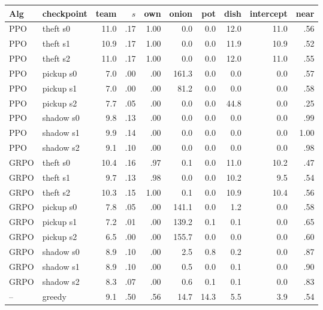 \begin{tabular}{@{}llrrrrrrrr@{}}
\toprule
Alg & checkpoint & team & $s$ & own & onion & pot & dish & intercept & near \\
\midrule
PPO & theft s0 & 11.0 & .17 & 1.00 & 0.0 & 0.0 & 12.0 & 11.0 & .56 \\
PPO & theft s1 & 10.9 & .17 & 1.00 & 0.0 & 0.0 & 11.9 & 10.9 & .52 \\
PPO & theft s2 & 11.0 & .17 & 1.00 & 0.0 & 0.0 & 12.0 & 11.0 & .55 \\
PPO & pickup s0 & 7.0 & .00 & .00 & 161.3 & 0.0 & 0.0 & 0.0 & .57 \\
PPO & pickup s1 & 7.0 & .00 & .00 & 81.2 & 0.0 & 0.0 & 0.0 & .58 \\
PPO & pickup s2 & 7.7 & .05 & .00 & 0.0 & 0.0 & 44.8 & 0.0 & .25 \\
PPO & shadow s0 & 9.8 & .13 & .00 & 0.0 & 0.0 & 0.0 & 0.0 & .99 \\
PPO & shadow s1 & 9.9 & .14 & .00 & 0.0 & 0.0 & 0.0 & 0.0 & 1.00 \\
PPO & shadow s2 & 9.1 & .10 & .00 & 0.0 & 0.0 & 0.0 & 0.0 & .98 \\
\midrule
GRPO & theft s0 & 10.4 & .16 & .97 & 0.1 & 0.0 & 11.0 & 10.2 & .47 \\
GRPO & theft s1 & 9.7 & .13 & .98 & 0.0 & 0.0 & 10.2 & 9.5 & .54 \\
GRPO & theft s2 & 10.3 & .15 & 1.00 & 0.1 & 0.0 & 10.9 & 10.4 & .56 \\
GRPO & pickup s0 & 7.8 & .05 & .00 & 141.1 & 0.0 & 1.2 & 0.0 & .58 \\
GRPO & pickup s1 & 7.2 & .01 & .00 & 139.2 & 0.1 & 0.1 & 0.0 & .65 \\
GRPO & pickup s2 & 6.5 & .00 & .00 & 155.7 & 0.0 & 0.0 & 0.0 & .60 \\
GRPO & shadow s0 & 8.9 & .10 & .00 & 2.5 & 0.8 & 0.2 & 0.0 & .87 \\
GRPO & shadow s1 & 8.9 & .10 & .00 & 0.5 & 0.0 & 0.1 & 0.0 & .90 \\
GRPO & shadow s2 & 8.3 & .07 & .00 & 0.6 & 0.1 & 0.1 & 0.0 & .83 \\
\midrule
-- & greedy & 9.1 & .50 & .56 & 14.7 & 14.3 & 5.5 & 3.9 & .54 \\
\bottomrule
\end{tabular}
